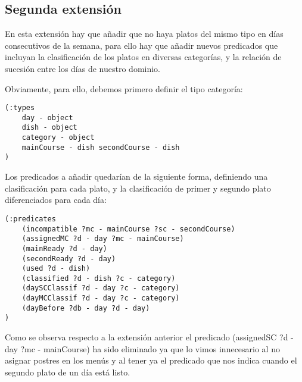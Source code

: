 \documentclass{article}
\begin{document}
\subsection{Segunda extensión}
En esta extensión hay que añadir que no  haya platos del mismo tipo en días consecutivos de la semana, para ello hay que añadir nuevos predicados que incluyan la clasificación de los platos en diversas categorías, y la relación de sucesión entre los días de nuestro dominio.
\par
Obviamente, para ello, debemos primero definir el tipo categoría:
\begin{lstlisting}[language=pddl]
(:types
    day - object
    dish - object
    category - object
    mainCourse - dish secondCourse - dish
)
\end{lstlisting}
Los predicados a añadir quedarían de la siguiente forma, definiendo una clasificación para cada plato, y la clasificación de primer y segundo plato diferenciados para cada día:
\begin{lstlisting}[language=pddl]
(:predicates
    (incompatible ?mc - mainCourse ?sc - secondCourse)
    (assignedMC ?d - day ?mc - mainCourse)
    (mainReady ?d - day)
    (secondReady ?d - day)
    (used ?d - dish)
    (classified ?d - dish ?c - category)
    (daySCClassif ?d - day ?c - category)
    (dayMCClassif ?d - day ?c - category)
    (dayBefore ?db - day ?d - day)
)
\end{lstlisting}
Como se observa respecto a la extensión anterior el predicado (assignedSC ?d - day ?mc - mainCourse) ha sido eliminado ya que lo vimos innecesario al no asignar postres en los menús y al tener ya el predicado que nos indica cuando el segundo plato de un día está listo.
\par
\end{document}
